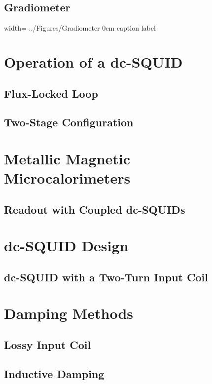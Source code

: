 \subsection{Gradiometer}

{width=\textwidth}
{../Figures/Gradiometer}
{0cm}   %
{caption}
{label}


\section{Operation of a dc-SQUID}

\subsection{Flux-Locked Loop}

\subsection{Two-Stage Configuration}

\section{Metallic Magnetic Microcalorimeters} \label{sec_MMC}

\subsection{Readout with Coupled dc-SQUIDs}

\section{dc-SQUID Design}

\subsection{dc-SQUID with a Two-Turn Input Coil}


\section{Damping Methods} \label{sec_damping}

\subsection{Lossy Input Coil}

\subsection{Inductive Damping}